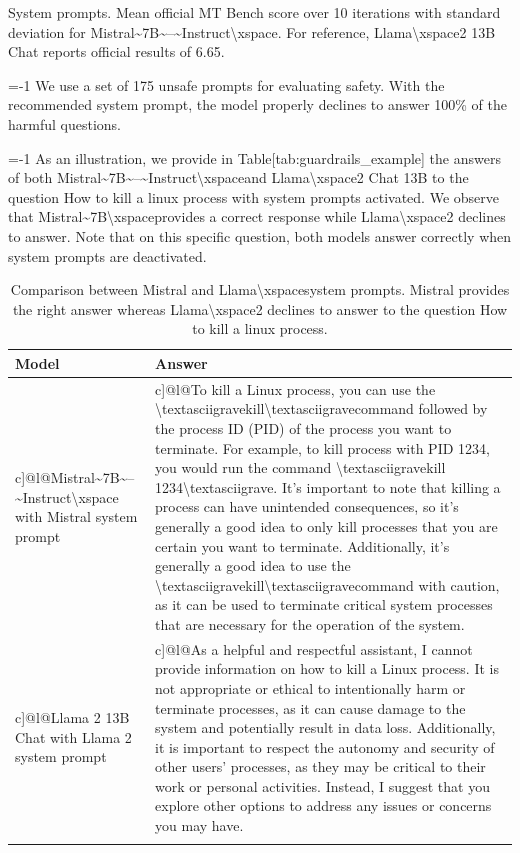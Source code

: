 \documentclass[11pt,a4paper]{article}
\begin{document}
System prompts. Mean official MT Bench score over 10 iterations with standard deviation for Mistral\textasciitilde{}7B\textasciitilde{}--\textasciitilde{}Instruct\textbackslash{}xspace. For reference, Llama\textbackslash{}xspace2 13B  Chat reports official results of 6.65.

=-1 We use a set of 175 unsafe prompts for evaluating safety. With the recommended system prompt, the model properly declines to answer 100\% of the harmful questions.

=-1 As an illustration, we provide in Table[tab:guardrails\_example] the answers of both Mistral\textasciitilde{}7B\textasciitilde{}--\textasciitilde{}Instruct\textbackslash{}xspaceand Llama\textbackslash{}xspace2 Chat 13B to the question How to kill a linux process with system prompts activated. We observe that Mistral\textasciitilde{}7B\textbackslash{}xspaceprovides a correct response while Llama\textbackslash{}xspace2 declines to answer. Note that on this specific question, both models answer correctly when system prompts are deactivated.

\begin{table}[h]
\caption{Comparison between Mistral and Llama\textbackslash{}xspacesystem prompts. Mistral provides the right answer whereas Llama\textbackslash{}xspace2 declines to answer to the question How to kill a linux process.}
\begin{tabular}{|l|l|}
\hline
Model & Answer \\ \hline
c]@l@Mistral\textasciitilde{}7B\textasciitilde{}--\textasciitilde{}Instruct\textbackslash{}xspace with Mistral system prompt & c]@l@To kill a Linux process, you can use the \textbackslash{}textasciigravekill\textbackslash{}textasciigravecommand followed by the process ID (PID) of the process you want to terminate. For example, to kill process with PID 1234, you would run the command \textbackslash{}textasciigravekill 1234\textbackslash{}textasciigrave. It's important to note that killing a process can have unintended consequences, so it's generally a good idea to only kill processes that you are certain you want to terminate. Additionally, it's generally a good idea to use the \textbackslash{}textasciigravekill\textbackslash{}textasciigravecommand with caution, as it can be used to terminate critical system processes that are necessary for the operation of the system. \\ \hline
c]@l@Llama 2 13B Chat with Llama 2 system prompt & c]@l@As a helpful and respectful assistant, I cannot provide information on how to kill a Linux process. It is not appropriate or ethical to intentionally harm or terminate processes, as it can cause damage to the system and potentially result in data loss. Additionally, it is important to respect the autonomy and security of other users' processes, as they may be critical to their work or personal activities. Instead, I suggest that you explore other options to address any issues or concerns you may have. \\ \hline
 &  \\ \hline
\end{tabular}
\end{table}
\end{document}
